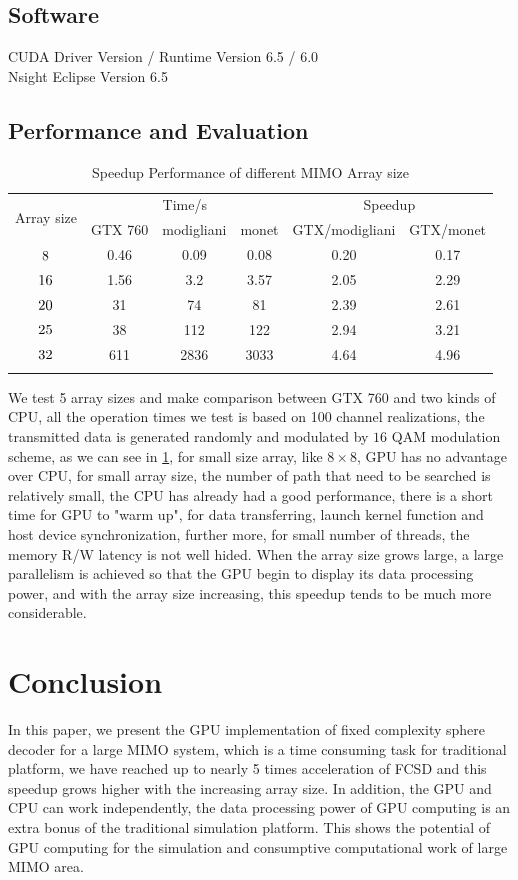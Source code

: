 \documentclass[12pt,a4paper,final]{article}
\begin{document}
\begin{spacing}{2.5}
\subsection{Software}
CUDA Driver Version / Runtime Version      6.5 / 6.0\\
Nsight Eclipse Version 6.5
\subsection{Performance and Evaluation}
\begin{table}[htb]
\caption{Speedup Performance of different MIMO Array size}
\centering
\begin{tabular}{|c|c|c|c|c|c|}
\hline
\multirow{2}{*}{ Array size} & \multicolumn{3}{|c|}{Time/s} & \multicolumn{2}{|c|}{Speedup}\\
\cline{2-6}
&GTX 760 & modigliani & monet & GTX/modigliani  & GTX/monet \\
\hline
$8\time 8$& 0.46& 0.09&0.08 & 0.20& 0.17\\
\hline
$16\time 16$&1.56 &3.2&3.57& 2.05& 2.29\\
\hline
$20\time 20$&31 & 74& 81& 2.39& 2.61\\
\hline
$25\time 25$& 38& 112& 122& 2.94& 3.21\\
\hline
$32\time 32$& 611&2836&3033&4.64& 4.96 \\
\hline
\label{speedup}
\end{tabular}
\end{table}
  \quad We test 5 array sizes and make comparison between GTX 760 and two kinds of CPU, all the operation times we test is based on 100 channel realizations, the transmitted data is generated randomly and modulated by $16$ QAM modulation scheme,  as we can see in \ref{speedup}, for small size array, like $8\times 8$, GPU has no advantage over CPU, for small array size, the number of path that need to be searched is relatively small, the CPU has already had a good performance, there is a short time for GPU to "warm up", for data transferring, launch kernel function and host device synchronization, further more, for small number of threads, the memory R/W latency is not well hided. When the array size grows large, a large parallelism is achieved so that the GPU begin to display its data processing power, and with the array size increasing, this speedup tends to be much more considerable.
\section{Conclusion}
In this paper, we present the GPU implementation of fixed complexity sphere decoder for a large MIMO system, which is a time consuming task for traditional platform, we have reached up to nearly 5 times acceleration of FCSD and this speedup grows higher with the increasing array size. In addition, the GPU and CPU can work independently, the data processing power of GPU computing is an extra bonus of the traditional simulation platform. This shows the potential of GPU computing for the simulation and consumptive computational work of large MIMO area.      



\end{spacing}
\end{document}
